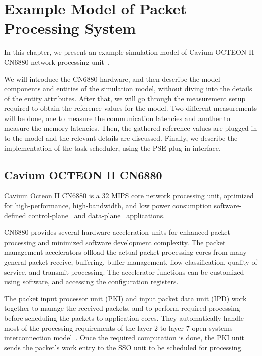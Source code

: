 \chapter{Example Model of Packet Processing System}
\label{chapter:example-simulation-model}

In this chapter, we present an example simulation model of Cavium OCTEON II CN6880 network processing unit~\cite{Cavium OCTEON}.

We will introduce the CN6880 hardware, and then describe the model components and entities of the simulation model, without diving into the details of the entity attributes. After that, we will go through the measurement setup required to obtain the reference values for the model. Two different measurements will be done, one to measure the communication latencies and another to measure the memory latencies. Then, the gathered reference values are plugged in to the model and the relevant details are discussed. Finally, we describe the implementation of the task scheduler, using the PSE plug-in interface.

\section{Cavium OCTEON II CN6880}
\label{sec:cavium-octeon}

Cavium Octeon II CN6880 is a 32 MIPS core network processing unit, optimized for high-performance, high-bandwidth, and low power consumption software-defined control-plane~\cite{control-plane} and data-plane~\cite{data-plane} applications.

CN6880 provides several hardware acceleration units for enhanced packet processing and minimized software development complexity. The packet management accelerators offload the actual packet processing cores from many general packet receive, buffering, buffer management, flow classification, quality of service, and transmit processing. The accelerator functions can be customized using software, and accessing the configuration registers.~\cite{cavium:2010:fundamentals}

The packet input processor unit (PKI) and input packet data unit (IPD) work together to manage the received packets, and to perform required processing before scheduling the packets to application cores. They automatically handle most of the processing requirements of the layer 2 to layer 7 open systems interconnection model~\cite{OSI model}. Once the required computation is done, the PKI unit sends the packet's work entry to the SSO unit to be scheduled for processing.~\cite{cavium:2010:fundamentals}

